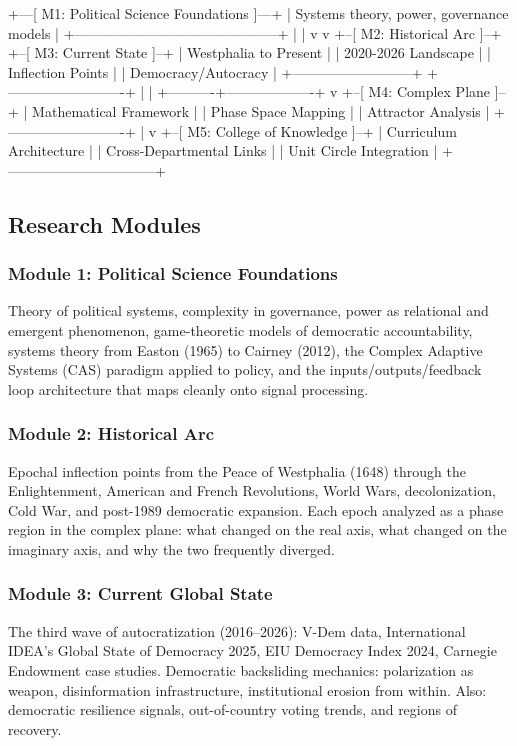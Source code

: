 \documentclass[11pt,letterpaper]{article}
\begin{document}
\begin{asciibox}
+---[ M1: Political Science Foundations ]---+
|  Systems theory, power, governance models  |
+--------------------------------------------+
         |                    |
         v                    v
+--[ M2: Historical Arc ]--+  +--[ M3: Current State ]--+
|  Westphalia to Present   |  |  2020-2026 Landscape    |
|  Inflection Points       |  |  Democracy/Autocracy    |
+--------------------------+  +-------------------------+
         |                              |
         +----------+-------------------+
                    v
         +--[ M4: Complex Plane ]--+
         |  Mathematical Framework  |
         |  Phase Space Mapping     |
         |  Attractor Analysis      |
         +-------------------------+
                    |
                    v
         +--[ M5: College of Knowledge ]--+
         |  Curriculum Architecture       |
         |  Cross-Departmental Links      |
         |  Unit Circle Integration       |
         +--------------------------------+
\end{asciibox}

\subsection{Research Modules}

\subsubsection{Module 1: Political Science Foundations}
Theory of political systems, complexity in governance, power as relational and emergent phenomenon, game-theoretic models of democratic accountability, systems theory from Easton (1965) to Cairney (2012), the Complex Adaptive Systems (CAS) paradigm applied to policy, and the inputs/outputs/feedback loop architecture that maps cleanly onto signal processing.

\subsubsection{Module 2: Historical Arc}
Epochal inflection points from the Peace of Westphalia (1648) through the Enlightenment, American and French Revolutions, World Wars, decolonization, Cold War, and post-1989 democratic expansion. Each epoch analyzed as a phase region in the complex plane: what changed on the real axis, what changed on the imaginary axis, and why the two frequently diverged.

\subsubsection{Module 3: Current Global State}
The third wave of autocratization (2016--2026): V-Dem data, International IDEA's Global State of Democracy 2025, EIU Democracy Index 2024, Carnegie Endowment case studies. Democratic backsliding mechanics: polarization as weapon, disinformation infrastructure, institutional erosion from within. Also: democratic resilience signals, out-of-country voting trends, and regions of recovery.
\end{document}
